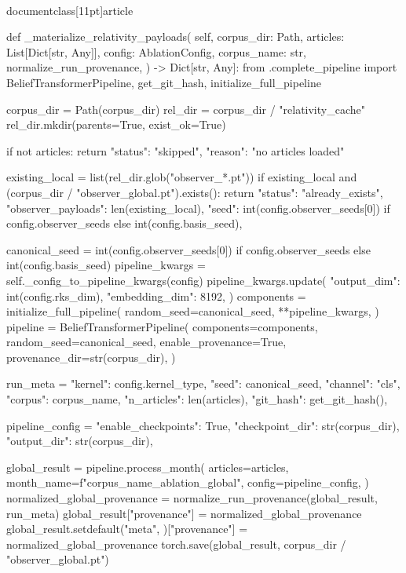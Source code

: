 \\documentclass[11pt]{article}
\begin{document}
\begin{CodeBlock}
    def _materialize_relativity_payloads(
        self,
        corpus_dir: Path,
        articles: List[Dict[str, Any]],
        config: AblationConfig,
        corpus_name: str,
        normalize_run_provenance,
    ) -> Dict[str, Any]:
        from .complete_pipeline import BeliefTransformerPipeline, get_git_hash, initialize_full_pipeline

        corpus_dir = Path(corpus_dir)
        rel_dir = corpus_dir / "relativity_cache"
        rel_dir.mkdir(parents=True, exist_ok=True)

        if not articles:
            return {"status": "skipped", "reason": "no articles loaded"}

        existing_local = list(rel_dir.glob("observer_*.pt"))
        if existing_local and (corpus_dir / "observer_global.pt").exists():
            return {
                "status": "already_exists",
                "observer_payloads": len(existing_local),
                "seed": int(config.observer_seeds[0]) if config.observer_seeds else int(config.basis_seed),
            }

        canonical_seed = int(config.observer_seeds[0]) if config.observer_seeds else int(config.basis_seed)
        pipeline_kwargs = self._config_to_pipeline_kwargs(config)
        pipeline_kwargs.update(
            {
                "output_dim": int(config.rks_dim),
                "embedding_dim": 8192,
            }
        )
        components = initialize_full_pipeline(
            random_seed=canonical_seed,
            **pipeline_kwargs,
        )
        pipeline = BeliefTransformerPipeline(
            components=components,
            random_seed=canonical_seed,
            enable_provenance=True,
            provenance_dir=str(corpus_dir),
        )

        run_meta = {
            "kernel": config.kernel_type,
            "seed": canonical_seed,
            "channel": "cls",
            "corpus": corpus_name,
            "n_articles": len(articles),
            "git_hash": get_git_hash(),
        }

        pipeline_config = {
            "enable_checkpoints": True,
            "checkpoint_dir": str(corpus_dir),
            "output_dir": str(corpus_dir),
        }

        global_result = pipeline.process_month(
            articles=articles,
            month_name=f"{corpus_name}_ablation_global",
            config=pipeline_config,
        )
        normalized_global_provenance = normalize_run_provenance(global_result, run_meta)
        global_result["provenance"] = normalized_global_provenance
        global_result.setdefault("meta", {})["provenance"] = normalized_global_provenance
        torch.save(global_result, corpus_dir / "observer_global.pt")


\end{CodeBlock}
\end{document}
